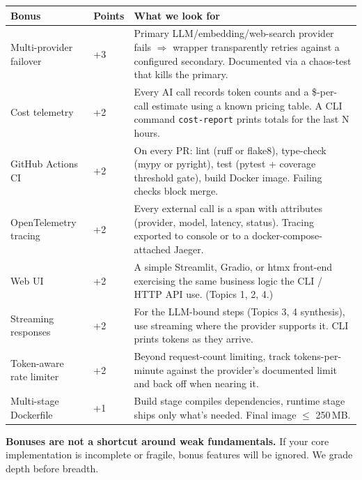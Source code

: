 \documentclass[11pt,a4paper]{article}
\newcommand{\warn}[1]{\textcolor{accent2}{\textbf{#1}}}
\begin{document}
\begin{center}\small
\begin{tabular}{>{\raggedright\arraybackslash}p{5cm} >{\centering\arraybackslash}p{1.3cm} >{\raggedright\arraybackslash}p{9cm}}
\toprule
\textbf{Bonus} & \textbf{Points} & \textbf{What we look for}\\
\midrule
Multi-provider failover & +3 & Primary LLM/embedding/web-search provider fails $\Rightarrow$ wrapper transparently retries against a configured secondary. Documented via a chaos-test that kills the primary.\\[2pt]
Cost telemetry & +2 & Every AI call records token counts and a \$-per-call estimate using a known pricing table. A CLI command \texttt{cost-report} prints totals for the last N hours.\\[2pt]
GitHub Actions CI & +2 & On every PR: lint (ruff or flake8), type-check (mypy or pyright), test (pytest + coverage threshold gate), build Docker image. Failing checks block merge.\\[2pt]
OpenTelemetry tracing & +2 & Every external call is a span with attributes (provider, model, latency, status). Tracing exported to console or to a docker-compose-attached Jaeger.\\[2pt]
Web UI & +2 & A simple Streamlit, Gradio, or htmx front-end exercising the same business logic the CLI / HTTP API use. (Topics 1, 2, 4.)\\[2pt]
Streaming responses & +2 & For the LLM-bound steps (Topics 3, 4 synthesis), use streaming where the provider supports it. CLI prints tokens as they arrive.\\[2pt]
Token-aware rate limiter & +2 & Beyond request-count limiting, track tokens-per-minute against the provider's documented limit and back off when nearing it.\\[2pt]
Multi-stage Dockerfile & +1 & Build stage compiles dependencies, runtime stage ships only what's needed. Final image $\le$ 250\,MB.\\[2pt]
\bottomrule
\end{tabular}
\end{center}

\warn{Bonuses are not a shortcut around weak fundamentals.} If your core implementation is incomplete or fragile, bonus features will be ignored. We grade depth before breadth.

\end{document}
